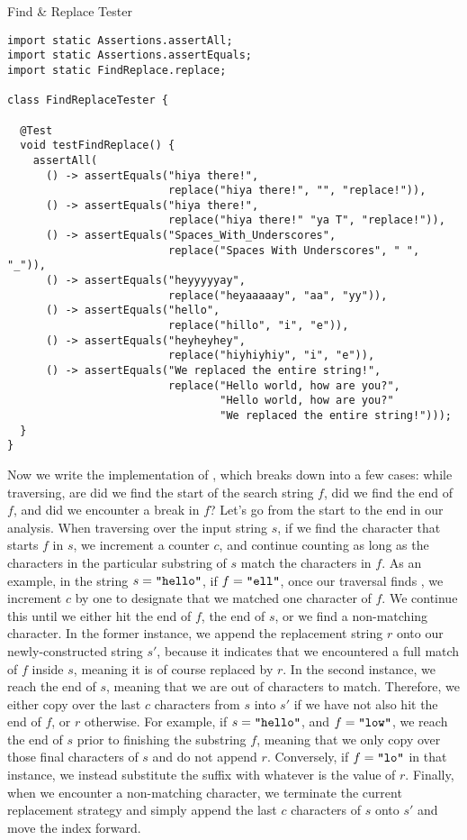 \begin{cl}{Find \& Replace Tester}
\begin{lstlisting}[language=MyJava]
import static Assertions.assertAll;
import static Assertions.assertEquals;
import static FindReplace.replace;

class FindReplaceTester {

  @Test
  void testFindReplace() {
    assertAll(
      () -> assertEquals("hiya there!",
                         replace("hiya there!", "", "replace!")),
      () -> assertEquals("hiya there!",
                         replace("hiya there!" "ya T", "replace!")),
      () -> assertEquals("Spaces_With_Underscores",
                         replace("Spaces With Underscores", " ", "_")),
      () -> assertEquals("heyyyyyay",
                         replace("heyaaaaay", "aa", "yy")),
      () -> assertEquals("hello",
                         replace("hillo", "i", "e")),
      () -> assertEquals("heyheyhey",
                         replace("hiyhiyhiy", "i", "e")),
      () -> assertEquals("We replaced the entire string!",
                         replace("Hello world, how are you?", 
                                 "Hello world, how are you?" 
                                 "We replaced the entire string!")));
  }
}
\end{lstlisting}
\end{cl}

Now we write the implementation of , which breaks down into a few cases: while traversing, are did we find the start of the search string $f$, did we find the end of $f$, and did we encounter a break in $f$? Let's go from the start to the end in our analysis. When traversing over the input string $s$, if we find the character that starts $f$ in $s$, we increment a counter $c$, and continue counting as long as the characters in the particular substring of $s$ match the characters in $f$. As an example, in the string $s=\texttt{"hello"}$, if $f=\texttt{"ell"}$, once our traversal finds , we increment $c$ by one to designate that we matched one character of $f$. We continue this until we either hit the end of $f$, the end of $s$, or we find a non-matching character. In the former instance, we append the replacement string $r$ onto our newly-constructed string $s'$, because it indicates that we encountered a full match of $f$ inside $s$, meaning it is of course replaced by $r$. In the second instance, we reach the end of $s$, meaning that we are out of characters to match. Therefore, we either copy over the last $c$ characters from $s$ into $s'$ if we have not also hit the end of $f$, or $r$ otherwise. For example, if $s=\texttt{"hello"}$, and $f=\texttt{"low"}$, we reach the end of $s$ prior to finishing the substring $f$, meaning that we only copy over those final characters of $s$ and do not append $r$. Conversely, if $f=\texttt{"lo"}$ in that instance, we instead substitute the suffix  with whatever is the value of $r$. Finally, when we encounter a non-matching character, we terminate the current replacement strategy and simply append the last $c$ characters of $s$ onto $s'$ and move the index forward.

